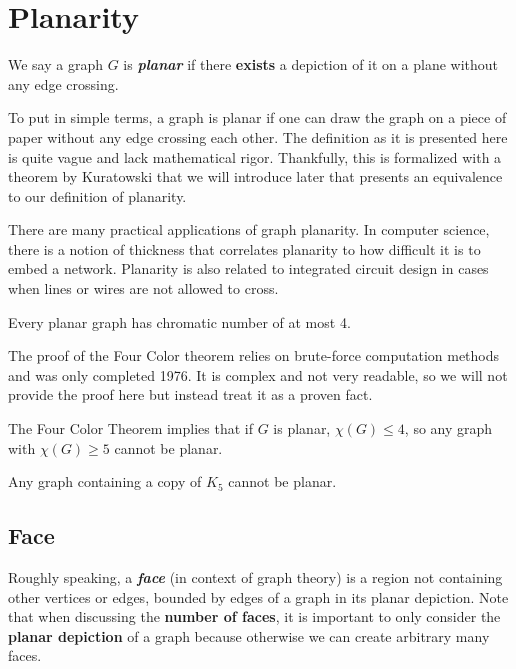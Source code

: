 



\section{Planarity}

\begin{definition}[Planarity]
    We say a graph $G$ is \textit{\textbf{planar}} if there \textbf{exists} a depiction of it on a plane without any edge crossing.
\end{definition}

To put in simple terms, a graph is planar if one can draw the graph on a piece of paper without any edge crossing each other. The definition as it is presented here is quite vague and lack mathematical rigor. Thankfully, this is formalized with a theorem by Kuratowski that we will introduce later that presents an equivalence to our definition of planarity.

There are many practical applications of graph planarity. In computer science, there is a notion of thickness that correlates planarity to how difficult it is to embed a network. Planarity is also related to integrated circuit design in cases when lines or wires are not allowed to cross.

\begin{theorem}
    Every planar graph has chromatic number of at most 4.
\end{theorem}

The proof of the Four Color theorem relies on brute-force computation methods and was only completed 1976. It is complex and not very readable, so we will not provide the proof here but instead treat it as a proven fact.

The Four Color Theorem implies that if $G$ is planar, $\chi(G) \leq 4$, so any graph with $\chi(G) \geq 5$ cannot be planar.

\begin{corollary}
    Any graph containing a copy of $K_5$ cannot be planar.
\end{corollary}

\subsection{Face}

Roughly speaking, a \textit{\textbf{face}} (in context of graph theory) is a region not containing other vertices or edges, bounded by edges of a graph in its planar depiction. Note that when discussing the \textbf{number of faces}, it is important to only consider the \textbf{planar depiction} of a graph because otherwise we can create arbitrary many faces.

